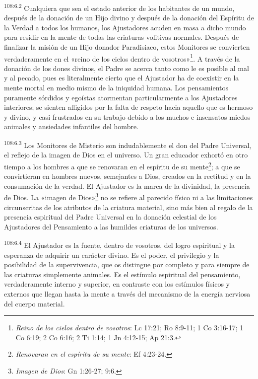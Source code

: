 \par
\textsuperscript{108:6.2} Cualquiera que sea el estado anterior de los habitantes de un mundo, después de la donación de un Hijo divino y después de la donación del Espíritu de la Verdad a todos los humanos, los Ajustadores acuden en masa a dicho mundo para residir en la mente de todas las criaturas volitivas normales. Después de finalizar la misión de un Hijo donador Paradisiaco, estos Monitores se convierten verdaderamente en el «reino de los cielos dentro de vosotros»\footnote{\textit{Reino de los cielos dentro de vosotros}: Lc 17:21; Ro 8:9-11; 1 Co 3:16-17; 1 Co 6:19; 2 Co 6:16; 2 Ti 1:14; 1 Jn 4:12-15; Ap 21:3.}. A través de la donación de los dones divinos, el Padre se acerca tanto como le es posible al mal y al pecado, pues es literalmente cierto que el Ajustador ha de coexistir en la mente mortal en medio mismo de la iniquidad humana. Los pensamientos puramente sórdidos y egoístas atormentan particularmente a los Ajustadores interiores; se sienten afligidos por la falta de respeto hacia aquello que es hermoso y divino, y casi frustrados en su trabajo debido a los muchos e insensatos miedos animales y ansiedades infantiles del hombre.

\par
\textsuperscript{108:6.3} Los Monitores de Misterio son indudablemente el don del Padre Universal, el reflejo de la imagen de Dios en el universo. Un gran educador exhortó en otro tiempo a los hombres a que se renovaran en el espíritu de su mente\footnote{\textit{Renovaran en el espíritu de su mente}: Ef 4:23-24.}; a que se convirtieran en hombres nuevos, semejantes a Dios, creados en la rectitud y en la consumación de la verdad. El Ajustador es la marca de la divinidad, la presencia de Dios. La «imagen de Dios»\footnote{\textit{Imagen de Dios}: Gn 1:26-27; 9:6.} no se refiere al parecido físico ni a las limitaciones circunscritas de los atributos de la criatura material, sino más bien al regalo de la presencia espiritual del Padre Universal en la donación celestial de los Ajustadores del Pensamiento a las humildes criaturas de los universos.

\par
\textsuperscript{108:6.4} El Ajustador es la fuente, dentro de vosotros, del logro espiritual y la esperanza de adquirir un carácter divino. Es el poder, el privilegio y la posibilidad de la supervivencia, que os distingue por completo y para siempre de las criaturas simplemente animales. Es el estímulo espiritual del pensamiento, verdaderamente interno y superior, en contraste con los estímulos físicos y externos que llegan hasta la mente a través del mecanismo de la energía nerviosa del cuerpo material.

